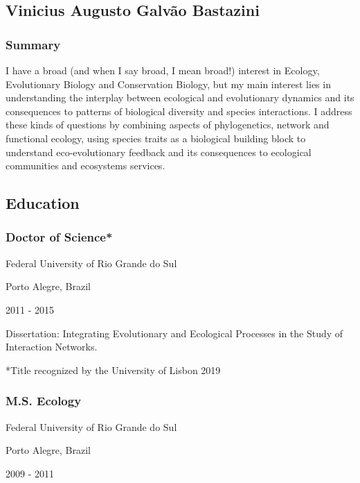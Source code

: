 \documentclass[
]{article}
\begin{document}
\hypertarget{title}{%
\subsection{Vinicius Augusto Galvão Bastazini}\label{title}}

\hypertarget{summary}{%
\subsubsection{Summary}\label{summary}}

I have a broad (and when I say broad, I mean broad!) interest in
Ecology, Evolutionary Biology and Conservation Biology, but my main
interest lies in understanding the interplay between ecological and
evolutionary dynamics and its consequences to patterns of biological
diversity and species interactions. I address these kinds of questions
by combining aspects of phylogenetics, network and functional ecology,
using species traits as a biological building block to understand
eco-evolutionary feedback and its consequences to ecological communities
and ecosystems services.

\hypertarget{education}{%
\subsection{Education}\label{education}}

\hypertarget{doctor-of-science}{%
\subsubsection{Doctor of Science*}\label{doctor-of-science}}

Federal University of Rio Grande do Sul

Porto Alegre, Brazil

2011 - 2015

Dissertation: Integrating Evolutionary and Ecological Processes in the
Study of Interaction Networks.

*Title recognized by the University of Lisbon 2019

\hypertarget{m.s.-ecology}{%
\subsubsection{M.S. Ecology}\label{m.s.-ecology}}

Federal University of Rio Grande do Sul

Porto Alegre, Brazil

2009 - 2011
\end{document}

